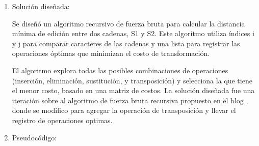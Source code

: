 
\begin{enumerate}[1)]
    \item Solución diseñada:

    Se diseñó un algoritmo recursivo de fuerza bruta 
    para calcular la distancia mínima de edición entre dos cadenas, S1 y S2. 
    Este algoritmo utiliza índices i y j
    para comparar caracteres de las cadenas y 
    una lista para registrar las operaciones óptimas que minimizan el 
    costo de transformación.
    
    El algoritmo explora todas las posibles 
    combinaciones de operaciones (inserción, eliminación, sustitución, y transposición) y
    selecciona la que tiene el menor costo, basado en una matriz de costos. 
    La solución diseñada fue una iteración sobre al algoritmo de fuerza bruta
    recursiva propuesto en el 
    blog \citeauthor{EditDistance} \cite{EditDistance}
    , donde se modifico para agregar la operación de transposición y llevar el registro
    de operaciones optimas.


\item Pseudocódigo:


\begin{algorithm}[H]

    \DontPrintSemicolon
    \footnotesize

\end{algorithm}
\end{enumerate}
